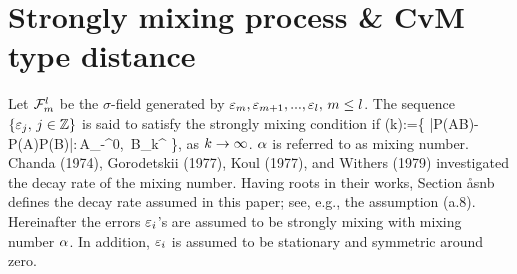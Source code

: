 \section{Strongly mixing process \& CvM type distance}
Let ${\cal F}_{m}^{l}$ be the $\sigma$-field generated by $\varepsilon_{m},\varepsilon_{m+1},...,\varepsilon_{l},\, m\le l$. The sequence $\{\varepsilon_{j}, \,j\in {\mathbb Z}\}$ is said to satisfy the strongly mixing condition if
\benn
\alpha(k):=\sup\left\{ |P(A\cap B)-P(A)P(B)|:\,A\in \cF_{-\iny}^{0}, \,B\in \cF_{k}^{\iny}
\right\},
\eenn
as $k\rightarrow\infty$. $\alpha$ is referred to as mixing number. Chanda (1974), Gorodetskii (1977), Koul (1977), and Withers (1979) investigated the decay rate of the mixing number. Having roots in their works, Section \r{asnb} defines the decay rate assumed in this paper; see, e.g., the assumption (a.8). Hereinafter the errors $\varepsilon_i$'s are assumed to be strongly mixing with mixing number $\alpha$. In addition, $\varepsilon_i$ is assumed to be stationary and symmetric around zero.

